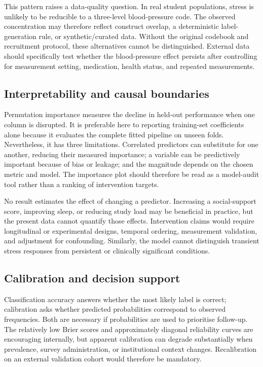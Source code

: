 \documentclass[review]{elsarticle}
\begin{document}
This pattern raises a data-quality question. In real student populations, stress is unlikely to be reducible to a three-level blood-pressure code. The observed concentration may therefore reflect construct overlap, a deterministic label-generation rule, or synthetic/curated data. Without the original codebook and recruitment protocol, these alternatives cannot be distinguished. External data should specifically test whether the blood-pressure effect persists after controlling for measurement setting, medication, health status, and repeated measurements.

\subsection{Interpretability and causal boundaries}
Permutation importance measures the decline in held-out performance when one column is disrupted. It is preferable here to reporting training-set coefficients alone because it evaluates the complete fitted pipeline on unseen folds. Nevertheless, it has three limitations. Correlated predictors can substitute for one another, reducing their measured importance; a variable can be predictively important because of bias or leakage; and the magnitude depends on the chosen metric and model. The importance plot should therefore be read as a model-audit tool rather than a ranking of intervention targets.

No result estimates the effect of changing a predictor. Increasing a social-support score, improving sleep, or reducing study load may be beneficial in practice, but the present data cannot quantify those effects. Intervention claims would require longitudinal or experimental designs, temporal ordering, measurement validation, and adjustment for confounding. Similarly, the model cannot distinguish transient stress responses from persistent or clinically significant conditions.

\subsection{Calibration and decision support}
Classification accuracy answers whether the most likely label is correct; calibration asks whether predicted probabilities correspond to observed frequencies. Both are necessary if probabilities are used to prioritise follow-up. The relatively low Brier scores and approximately diagonal reliability curves are encouraging internally, but apparent calibration can degrade substantially when prevalence, survey administration, or institutional context changes. Recalibration on an external validation cohort would therefore be mandatory.
\end{document}
